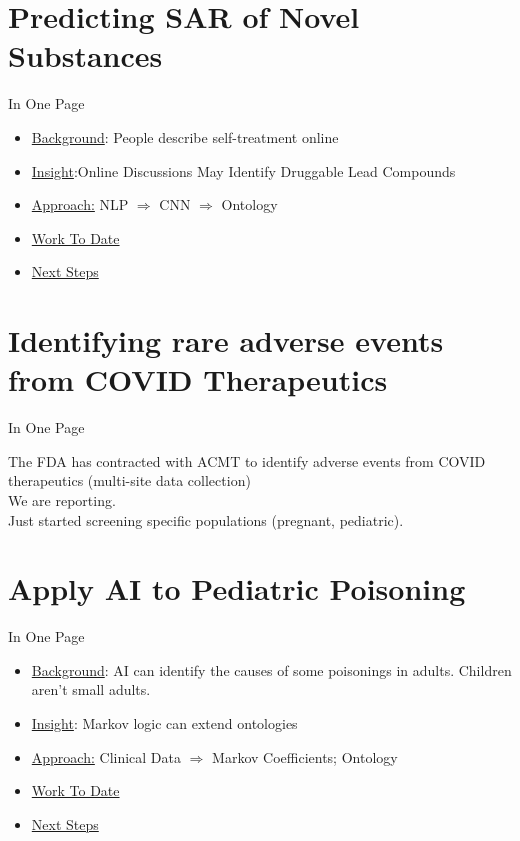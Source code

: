 \section[Neural Network]{Predicting SAR of Novel Substances}
\begin{frame}{In One Page}
\addtolength{\leftmargini}{\labelsep}
\begin{itemize}
	\item[] \uline{Background}: People describe self-treatment online
	\item[] \uline{Insight}:Online Discussions May Identify Druggable Lead Compounds 
	\item[] \uline{Approach:} NLP $\Rightarrow$ CNN $\Rightarrow$ Ontology
	\item[] \uline{Work To Date}
	\item[] \uline{Next Steps}
\end{itemize}
\end{frame}

\section[COVID]{Identifying rare adverse events from COVID Therapeutics}
\begin{frame}{In One Page}

The FDA has contracted with ACMT to identify adverse events from COVID therapeutics (multi-site data collection)\\
\vspace{1em}
We are reporting.\\
\vspace{1em}
Just started screening specific populations (pregnant, pediatric). \\
\end{frame} 


\section[Les enfants]{Apply AI to Pediatric Poisoning}
\begin{frame}{In One Page}
\addtolength{\leftmargini}{\labelsep}
\begin{itemize}
	\item[] \uline{Background}: AI can identify the causes of some poisonings in adults. Children aren't small adults. 
	\item[] \uline{Insight}: Markov logic can extend ontologies
	\item[] \uline{Approach:} Clinical Data $\Rightarrow$ Markov Coefficients; Ontology
	\item[] \uline{Work To Date}
	\item[] \uline{Next Steps}
\end{itemize}
\end{frame}

